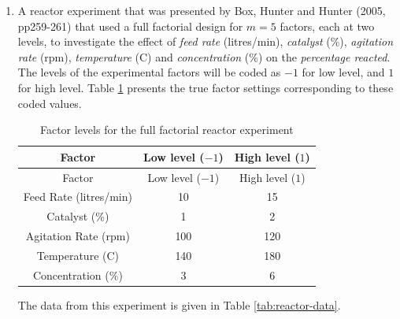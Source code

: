 \documentclass[
]{book}
\theoremstyle{definition}
\theoremstyle{definition}
\theoremstyle{definition}
\theoremstyle{definition}
\theoremstyle{remark}
\begin{document}
\begin{enumerate}
\def\labelenumi{\arabic{enumi}.}
\item
  A reactor experiment that was presented by Box, Hunter and Hunter (2005, pp259-261) that used a full factorial design for \(m=5\) factors, each at two levels, to investigate the effect of \emph{feed rate} (litres/min), \emph{catalyst} (\%), \emph{agitation rate} (rpm), \emph{temperature} (C) and \emph{concentration} (\%) on the \emph{percentage reacted}. The levels of the experimental factors will be coded as \(-1\) for low level, and \(1\) for high level. Table \ref{tab:reactor-expt} presents the true factor settings corresponding to these coded values.

  \begin{longtable}[]{@{}ccc@{}}
  \caption{\label{tab:reactor-expt} Factor levels for the full factorial reactor experiment}\tabularnewline
  \toprule
  Factor & Low level (\(-1\)) & High level (\(1\)) \\
  \midrule
  \endfirsthead
  \toprule
  Factor & Low level (\(-1\)) & High level (\(1\)) \\
  \midrule
  \endhead
  Feed Rate (litres/min) & 10 & 15 \\
  Catalyst (\%) & 1 & 2 \\
  Agitation Rate (rpm) & 100 & 120 \\
  Temperature (C) & 140 & 180 \\
  Concentration (\%) & 3 & 6 \\
  \bottomrule
  \end{longtable}

  The data from this experiment is given in Table \ref{tab:reactor-data}.


\end{enumerate}
\end{document}
